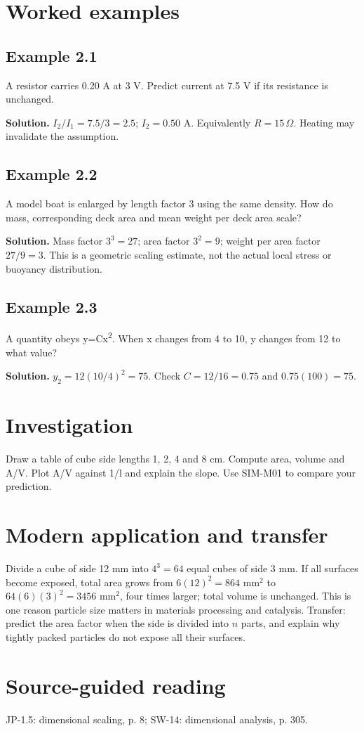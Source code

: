 \documentclass[11pt,a4paper,openany]{book}
\begin{document}
\section{Worked examples}
\subsection*{Example 2.1}
A resistor carries 0.20 A at 3 V. Predict current at 7.5 V if its resistance is unchanged.

\textbf{Solution.} $I_2/I_1=7.5/3=2.5$; $I_2=0.50$ A. Equivalently $R=15\,\Omega$. Heating may invalidate the assumption.
\subsection*{Example 2.2}
A model boat is enlarged by length factor 3 using the same density. How do mass, corresponding deck area and mean weight per deck area scale?

\textbf{Solution.} Mass factor $3^3=27$; area factor $3^2=9$; weight per area factor $27/9=3$. This is a geometric scaling estimate, not the actual local stress or buoyancy distribution.
\subsection*{Example 2.3}
A quantity obeys y=Cx\textsuperscript{2}. When x changes from 4 to 10, y changes from 12 to what value?

\textbf{Solution.} $y_2=12(10/4)^2=75$. Check $C=12/16=0.75$ and $0.75(100)=75$.
\section{Investigation}
Draw a table of cube side lengths 1, 2, 4 and 8 cm. Compute area, volume and A/V. Plot A/V against 1/l and explain the slope. Use SIM-M01 to compare your prediction.
\section{Modern application and transfer}
Divide a cube of side 12 mm into $4^3=64$ equal cubes of side 3 mm. If all surfaces become exposed, total area grows from $6(12)^2=864$ mm$^2$ to $64(6)(3)^2=3456$ mm$^2$, four times larger; total volume is unchanged. This is one reason particle size matters in materials processing and catalysis. Transfer: predict the area factor when the side is divided into $n$ parts, and explain why tightly packed particles do not expose all their surfaces.
\section{Source-guided reading}
JP-1.5: dimensional scaling, p. 8; SW-14: dimensional analysis, p. 305.
\end{document}
